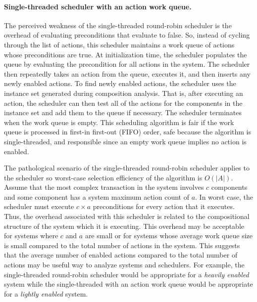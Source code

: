 \paragraph{Single-threaded scheduler with an action work queue.}
The perceived weakness of the single-threaded round-robin scheduler is the overhead of evaluating preconditions that evaluate to false.
So, instead of cycling through the list of actions, this scheduler maintains a work queue of actions whose preconditions are true.
At initialization time, the scheduler populates the queue by evaluating the precondition for all actions in the system.
The scheduler then repeatedly takes an action from the queue, executes it, and then inserts any newly enabled actions.
To find newly enabled actions, the scheduler uses the instance set generated during composition analysis.
That is, after executing an action, the scheduler can then test all of the actions for the components in the instance set and add them to the queue if necessary.
The scheduler terminates when the work queue is empty.
This scheduling algorithm is fair if the work queue is processed in first-in first-out (FIFO) order, safe because the algorithm is single-threaded, and responsible since an empty work queue implies no action is enabled.

The pathological scenario of the single-threaded round-robin scheduler applies to the scheduler so worst-case selection efficiency of the algorithm is $O(|A|)$.
Assume that the most complex transaction in the system involves $c$ components and some component has a system maximum action count of $a$.
In worst case, the scheduler must execute $c \times a$ preconditions for every action that it executes.
Thus, the overhead associated with this scheduler is related to the compositional structure of the system which it is executing.
This overhead may be acceptable for systems where $c$ and $a$ are small or for systems whose average work queue size is small compared to the total number of actions in the system.
This suggests that the average number of enabled actions compared to the total number of actions may be useful way to analyze systems and schedulers.
For example, the single-threaded round-robin scheduler would be appropriate for a \emph{heavily enabled} system while the single-threaded with an action work queue would be appropriate for a \emph{lightly enabled} system.

